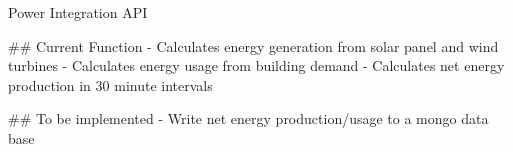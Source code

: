 Power Integration API

## Current Function
- Calculates energy generation from solar panel and wind turbines
- Calculates energy usage from building demand
- Calculates net energy production in 30 minute intervals

## To be implemented
- Write net energy production/usage to a mongo data base